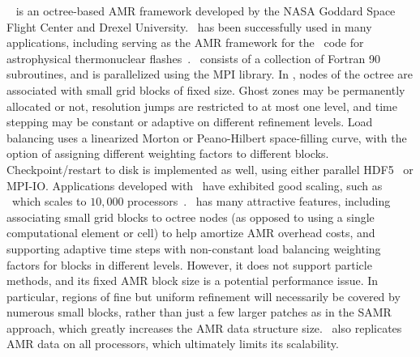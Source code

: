 \documentclass[11pt,letterpaper]{article}
\begin{document}
\SUBSUBSECTION{\paramesh}
%
\paramesh~\cite{wwwparamesh,MaOl00,Ol06,OlMa05}
is an octree-based AMR framework developed by the NASA Goddard Space
Flight Center and Drexel University.  \paramesh\ has been successfully
used in many applications, including serving as the AMR framework for
the \flash\ code for astrophysical thermonuclear
flashes~\cite{wwwflash,FrOl00}.  \paramesh\ consists of a
collection of Fortran 90 subroutines, and is parallelized using the
MPI library.
%
In \paramesh, nodes of the octree are associated with small grid
blocks of fixed size.  Ghost zones may be permanently allocated or
not, resolution jumps are restricted to at most one level, and time
stepping may be constant or adaptive on different refinement levels.
Load balancing uses a linearized Morton or Peano-Hilbert space-filling
curve, with the option of assigning different weighting factors to
different blocks.  Checkpoint/restart to disk is implemented as well,
using either parallel HDF5~\cite{wwwhdf5} or MPI-IO.  Applications
developed with \paramesh\ have exhibited good scaling, such as \flash\
which scales to $10,000$ processors~\cite{Du09}.
%
%
\paramesh\ has many attractive features, including associating small
grid blocks to octree nodes (as opposed to using a single
computational element or cell) to help amortize AMR overhead costs,
and supporting adaptive time steps with non-constant load balancing
weighting factors for blocks in different levels.  However, it does
not support particle methods, and its fixed AMR block size is a
potential performance issue.  In particular, regions of fine but
uniform refinement will necessarily be covered by numerous small blocks,
rather than just a few larger patches as in the SAMR approach,
which greatly increases the AMR data structure size.
\paramesh\ also replicates AMR data on all processors, which
ultimately limits its scalability.

\end{document}
